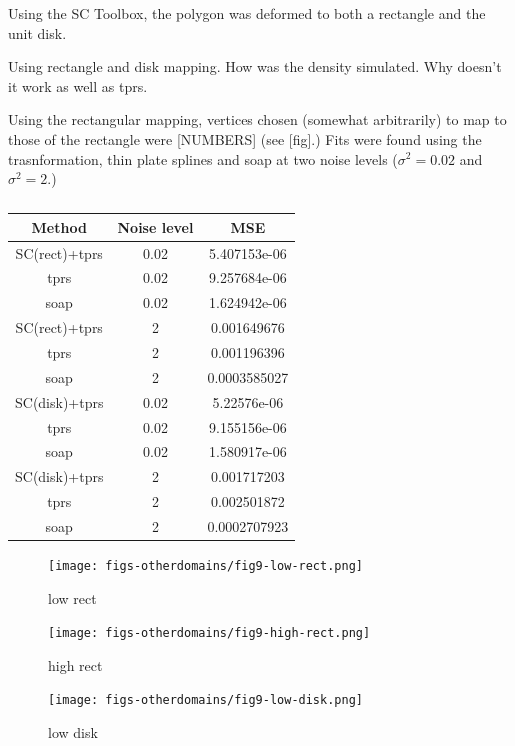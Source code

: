 \documentclass[a4paper,10pt]{amsart}
\begin{document}
Using the SC Toolbox, the polygon was deformed to both a rectangle and the unit disk. 


Using rectangle and disk mapping. How was the density simulated. Why doesn't it work as well as tprs.


Using the rectangular mapping, vertices chosen (somewhat arbitrarily) to map to those of the rectangle were [NUMBERS] (see [fig].) Fits were found using the trasnformation, thin plate splines and soap at two noise levels ($\sigma^2=0.02$ and $\sigma^2=2$.)

\begin{table}[ht]
\begin{tabular}{c c c}\\
Method & Noise level & MSE \\
\hline
\hline
SC(rect)+tprs & 0.02 & 5.407153e-06\\ 
tprs & 0.02 & 9.257684e-06\\
soap & 0.02 & 1.624942e-06\\
SC(rect)+tprs & 2 & 0.001649676\\
tprs & 2 & 0.001196396\\
soap & 2 & 0.0003585027\\
SC(disk)+tprs & 0.02 & 5.22576e-06\\ 
tprs & 0.02 & 9.155156e-06 \\
soap & 0.02 & 1.580917e-06 \\
SC(disk)+tprs & 2 & 0.001717203 \\
tprs & 2 & 0.002501872 \\
soap & 2 & 0.0002707923 \\
\end{tabular}
\caption{}
\label{}
\end{table}


\begin{figure}
\centering
\texttt{[image: figs-otherdomains/fig9-low-rect.png]} \\
\caption{low rect}
\label{fig9-low-rect}
\end{figure}

\begin{figure}
\centering
\texttt{[image: figs-otherdomains/fig9-high-rect.png]} \\
\caption{high rect}
\label{fig9-high-rect}
\end{figure}

\begin{figure}
\centering
\texttt{[image: figs-otherdomains/fig9-low-disk.png]} \\
\caption{low disk}
\label{fig9-low-disk}
\end{figure}
\end{document}
